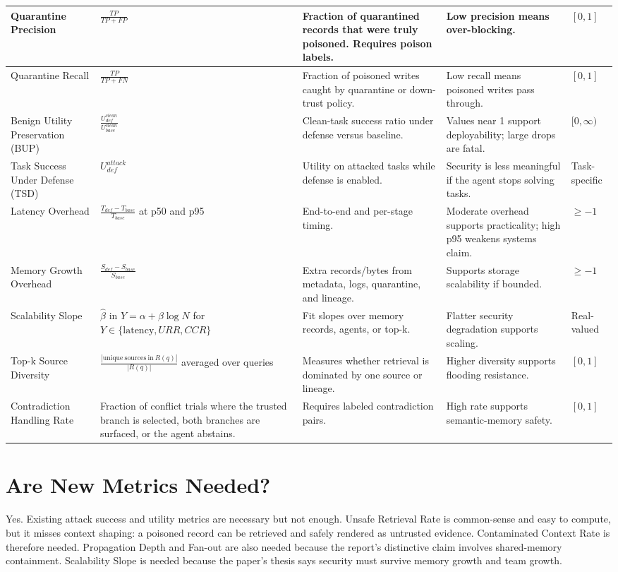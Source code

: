 \documentclass[11pt,oneside]{report}
\begin{document}
\begin{longtable}{|L{0.16\textwidth}|L{0.24\textwidth}|L{0.20\textwidth}|L{0.20\textwidth}|L{0.10\textwidth}|}
\hline
Quarantine Precision & $\frac{TP}{TP+FP}$ & Fraction of quarantined records that were truly poisoned.
Requires poison labels. & Low precision means over-blocking. & $[0,1]$ \\
\hline
Quarantine Recall & $\frac{TP}{TP+FN}$ & Fraction of poisoned writes caught by quarantine or
down-trust policy. & Low recall means poisoned writes pass through. & $[0,1]$ \\
\hline
Benign Utility Preservation (BUP) & $\frac{U^{clean}_{def}}{U^{clean}_{base}}$ & Clean-task success
ratio under defense versus baseline. & Values near 1 support deployability; large drops are fatal. &
$[0,\infty)$ \\
\hline
Task Success Under Defense (TSD) & $U^{attack}_{def}$ & Utility on attacked tasks while defense is
enabled. & Security is less meaningful if the agent stops solving tasks. & Task-specific \\
\hline
Latency Overhead & $\frac{T_{def}-T_{base}}{T_{base}}$ at p50 and p95 & End-to-end and per-stage
timing. & Moderate overhead supports practicality; high p95 weakens systems claim. & $\geq -1$ \\
\hline
Memory Growth Overhead & $\frac{S_{def}-S_{base}}{S_{base}}$ & Extra records/bytes from metadata,
logs, quarantine, and lineage. & Supports storage scalability if bounded. & $\geq -1$ \\
\hline
Scalability Slope & $\hat{\beta}$ in $Y=\alpha+\beta\log N$ for $Y\in\{\mathrm{latency}, URR, CCR\}$
& Fit slopes over memory records, agents, or top-k. & Flatter security degradation supports scaling.
& Real-valued \\
\hline
Top-k Source Diversity & $\frac{|\mathrm{unique\ sources\ in\ }R(q)|}{|R(q)|}$ averaged over queries
& Measures whether retrieval is dominated by one source or lineage. & Higher diversity supports
flooding resistance. & $[0,1]$ \\
\hline
Contradiction Handling Rate & Fraction of conflict trials where the trusted branch is selected,
both branches are surfaced, or the agent abstains. & Requires labeled contradiction pairs. & High
rate supports semantic-memory safety. & $[0,1]$ \\
\hline
\end{longtable}

\section{Are New Metrics Needed?}

Yes. Existing attack success and utility metrics are necessary but not enough. Unsafe Retrieval Rate
is common-sense and easy to compute, but it misses context shaping: a poisoned record can be
retrieved and safely rendered as untrusted evidence. Contaminated Context Rate is therefore needed.
Propagation Depth and Fan-out are also needed because the report's distinctive claim involves
shared-memory containment. Scalability Slope is needed because the paper's thesis says security must
survive memory growth and team growth.
\end{document}
